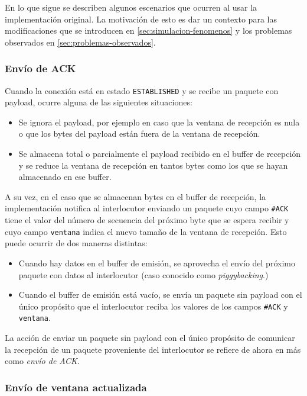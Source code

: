 \documentclass[a4paper, 10pt, twoside]{article}
\newcommand{\established}{\texttt{ESTABLISHED}\xspace}
\newcommand{\ack}{\texttt{\#ACK}\xspace}
\newcommand{\window}{\texttt{ventana}\xspace}
\begin{document}
En lo que sigue se describen algunos escenarios que ocurren al usar la implementación original. La motivación de esto es dar un contexto para las modificaciones que se introducen en \ref{sec:simulacion-fenomenos} y los problemas observados en \ref{sec:problemas-observados}.


\subsubsection{Envío de ACK}

Cuando la conexión está en estado \established y se recibe un paquete con payload, ocurre alguna de las siguientes situaciones:

\begin{itemize}
  \item Se ignora el payload, por ejemplo en caso que la ventana de recepción es nula o que los bytes del payload están fuera de la ventana de recepción.

  \item Se almacena total o parcialmente el payload recibido en el buffer de recepción y se reduce la ventana de recepción en tantos bytes como los que se hayan almacenado en ese buffer.
\end{itemize}

A su vez, en el caso que se almacenan bytes en el buffer de recepción, la implementación notifica al interlocutor enviando un paquete cuyo campo \ack tiene el valor del número de secuencia del próximo byte que se espera recibir y cuyo campo \window indica el nuevo tamaño de la ventana de recepción. Esto puede ocurrir de dos maneras distintas:

\begin{itemize}
  \item Cuando hay datos en el buffer de emisión, se aprovecha el envío del próximo paquete con datos al interlocutor (caso conocido como \textit{piggybacking}.)

  \item Cuando el buffer de emisión está vacío, se envía un paquete sin payload con el único propósito que el interlocutor reciba los valores de los campos \ack y \window.
\end{itemize}

La acción de enviar un paquete sin payload con el único propósito de comunicar la recepción de un paquete proveniente del interlocutor se refiere de ahora en más como \textit{envío de ACK}.


\subsubsection{Envío de ventana actualizada}
\end{document}
